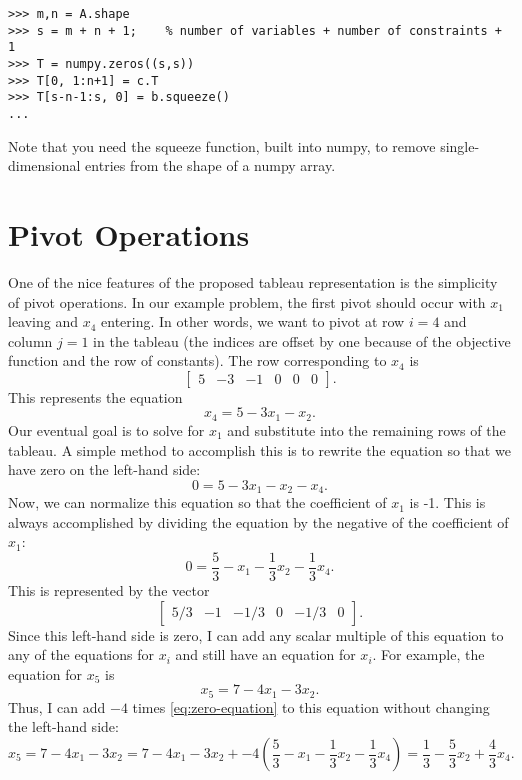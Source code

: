 \begin{lstlisting}
>>> m,n = A.shape
>>> s = m + n + 1;    % number of variables + number of constraints + 1
>>> T = numpy.zeros((s,s))
>>> T[0, 1:n+1] = c.T
>>> T[s-n-1:s, 0] = b.squeeze()
...
\end{lstlisting}

Note that you need the squeeze function, built into numpy, to remove single-dimensional entries from the shape of a numpy array. 

\section*{Pivot Operations}

One of the nice features of the proposed tableau representation is the simplicity of pivot operations.
In our example problem, the first pivot should occur with $x_1$ leaving and $x_4$ entering.
In other words, we want to pivot at row $i = 4$ and column $j = 1$ in the tableau (the indices are offset by one because of the objective function and the row of constants).
The row corresponding to $x_4$ is
\[
\begin{bmatrix} 5 &-3 &-1 & 0 & 0 & 0\end{bmatrix}.
\]
This represents the equation
\[
	x_4 = 5 - 3x_1 - x_2.
\]
Our eventual goal is to solve for $x_1$ and substitute into the remaining rows of the tableau.
A simple method to accomplish this is to rewrite the equation so that we have zero on the left-hand side:
\[
	0 = 5 - 3x_1 - x_2 - x_4.
\]
Now, we can normalize this equation so that the coefficient of $x_1$ is -1.
This is always accomplished by dividing the equation by the negative of the coefficient of $x_1$:
\begin{equation}\label{eq:zero-equation}
	0 = \frac{5}{3} - x_1 - \frac{1}{3}x_2 - \frac{1}{3}x_4.
\end{equation}
This is represented by the vector
\[
	\begin{bmatrix} 5/3 & -1 & -1/3 & 0 & -1/3 & 0\end{bmatrix}.
\]
Since this left-hand side is zero, I can add any scalar multiple of this equation to any of the equations for $x_i$ and still have an equation for $x_i$.
For example, the equation for $x_5$ is
\[
	x_5 = 7 - 4x_1 - 3x_2.
\]
Thus, I can add $-4$ times \eqref{eq:zero-equation} to this equation without changing the left-hand side:
\[ x_5 = 7 - 4x_1 - 3x_2 = 7 - 4x_1 - 3x_2 + -4\left(\frac{5}{3} - x_1 - \frac{1}{3}x_2 - \frac{1}{3}x_4\right) = \frac{1}{3} - \frac{5}{3}x_2 + \frac{4}{3} x_4.
\]
